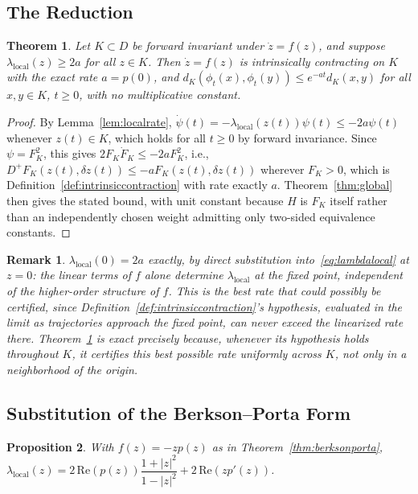 \documentclass[pdflatex,sn-mathphys-num]{sn-jnl}%
\theoremstyle{thmstyleone}%
\newtheorem{theorem}{Theorem}%
\newtheorem{proposition}[theorem]{Proposition}%
\theoremstyle{thmstyletwo}%
\newtheorem{remark}{Remark}%
\theoremstyle{thmstylethree}%
\begin{document}
\subsection{The Reduction}

\begin{theorem}
\label{thm:reduction}
Let $K\subset D$ be forward invariant under $\dot z=f(z)$, and suppose $\lambda_{\mathrm{local}}(z)\ge2a$ for all $z\in K$. Then $\dot z=f(z)$ is intrinsically contracting on $K$ with the exact rate $a=p(0)$, and $d_K(\phi_t(x),\phi_t(y))\le e^{-at}d_K(x,y)$ for all $x,y\in K$, $t\ge0$, with no multiplicative constant.
\end{theorem}

\begin{proof}
By Lemma~\ref{lem:localrate}, $\dot\psi(t)=-\lambda_{\mathrm{local}}(z(t))\psi(t)\le-2a\psi(t)$ whenever $z(t)\in K$, which holds for all $t\ge0$ by forward invariance. Since $\psi=F_K^2$, this gives $2F_K\dot F_K\le-2aF_K^2$, i.e., $D^+F_K(z(t),\delta z(t))\le-aF_K(z(t),\delta z(t))$ wherever $F_K>0$, which is Definition~\ref{def:intrinsiccontraction} with rate exactly $a$. Theorem~\ref{thm:global} then gives the stated bound, with unit constant because $H$ is $F_K$ itself rather than an independently chosen weight admitting only two-sided equivalence constants.
\end{proof}

\begin{remark}
\label{rem:exactness}
$\lambda_{\mathrm{local}}(0)=2a$ exactly, by direct substitution into~\eqref{eq:lambdalocal} at $z=0$: the linear terms of $f$ alone determine $\lambda_{\mathrm{local}}$ at the fixed point, independent of the higher-order structure of $f$. This is the best rate that could possibly be certified, since Definition~\ref{def:intrinsiccontraction}'s hypothesis, evaluated in the limit as trajectories approach the fixed point, can never exceed the linearized rate there. Theorem~\ref{thm:reduction} is exact precisely because, whenever its hypothesis holds throughout $K$, it certifies this best possible rate uniformly across $K$, not only in a neighborhood of the origin.
\end{remark}

\subsection{Substitution of the Berkson--Porta Form}

\begin{proposition}
\label{prop:bpsubstitution}
With $f(z)=-zp(z)$ as in Theorem~\ref{thm:berksonporta}, $\lambda_{\mathrm{local}}(z) = 2\,\mathrm{Re}(p(z))\dfrac{1+|z|^2}{1-|z|^2} + 2\,\mathrm{Re}(zp'(z))$.
\end{proposition}
\end{document}
